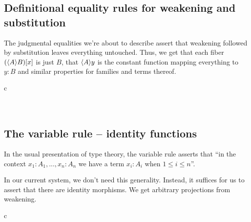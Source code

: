 \subsection{Definitional equality rules for weakening and substitution}
The judgmental equalities we're about to describe assert that weakening followed
by substitution leaves everything untouched. Thus, we get that each fiber
$\subst{x}{\ctxwk{A}{B}}$ is just $B$, that $\ctxwk{A}{y}$ is the constant function
mapping everything to $y:B$ and similar properties for families and terms thereof.

\begin{infarray}{c}
\\
\\
\\
\end{infarray}

\subsection{The variable rule -- identity functions}
In the usual presentation of type theory, the variable rule asserts that ``in
the context $x_1:A_1,...,x_n:A_n$ we have a term $x_i:A_i$ when $1\leq i\leq n$''.

In our current system, we don't need this generality. Instead, it suffices for
us to assert that there are identity morphisms. We get arbitrary projections
from weakening.

\begin{infarray}{c}
\\
\\
\\
\end{infarray}

